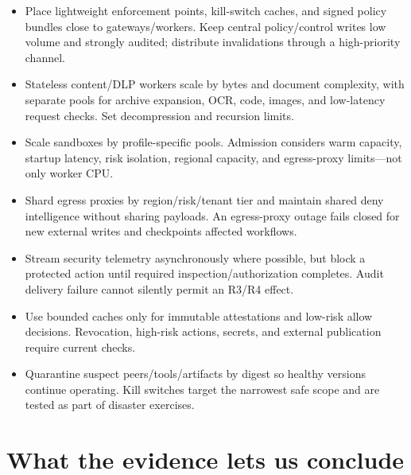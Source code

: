 \begin{itemize}

\item Place lightweight enforcement points, kill-switch caches, and signed policy bundles close to gateways/workers. Keep central policy/control writes low volume and strongly audited; distribute invalidations through a high-priority channel.

\item Stateless content/DLP workers scale by bytes and document complexity, with separate pools for archive expansion, OCR, code, images, and low-latency request checks. Set decompression and recursion limits.

\item Scale sandboxes by profile-specific pools. Admission considers warm capacity, startup latency, risk isolation, regional capacity, and egress-proxy limits—not only worker CPU.

\item Shard egress proxies by region/risk/tenant tier and maintain shared deny intelligence without sharing payloads. An egress-proxy outage fails closed for new external writes and checkpoints affected workflows.

\item Stream security telemetry asynchronously where possible, but block a protected action until required inspection/authorization completes. Audit delivery failure cannot silently permit an R3/R4 effect.

\item Use bounded caches only for immutable attestations and low-risk allow decisions. Revocation, high-risk actions, secrets, and external publication require current checks.

\item Quarantine suspect peers/tools/artifacts by digest so healthy versions continue operating. Kill switches target the narrowest safe scope and are tested as part of disaster exercises.

\end{itemize}

\section{What the evidence lets us conclude}

